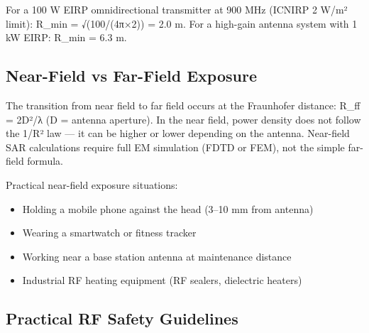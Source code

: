 For a 100 W EIRP omnidirectional transmitter at 900 MHz (ICNIRP 2 W/m² limit): R\_min = √(100/(4π×2)) = 2.0 m. For a high-gain antenna system with 1 kW EIRP: R\_min = 6.3 m.

      

\subsection{Near-Field vs Far-Field Exposure}

      

The transition from near field to far field occurs at the Fraunhofer distance: R\_ff = 2D²/λ (D = antenna aperture). In the near field, power density does not follow the 1/R² law — it can be higher or lower depending on the antenna. Near-field SAR calculations require full EM simulation (FDTD or FEM), not the simple far-field formula.

      

Practical near-field exposure situations:

      
\begin{itemize}

        \item Holding a mobile phone against the head (3–10 mm from antenna)

        \item Wearing a smartwatch or fitness tracker

        \item Working near a base station antenna at maintenance distance

        \item Industrial RF heating equipment (RF sealers, dielectric heaters)

      
\end{itemize}

      

\subsection{Practical RF Safety Guidelines}

